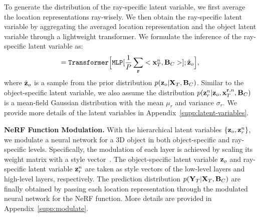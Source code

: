 To generate the distribution of the ray-specific latent variable, we first average the location representations ray-wisely. 
We then obtain the ray-specific latent variable by aggregating the averaged location representation and the object latent variable through a lightweight transformer. We formulate the inference of the ray-specific latent variable as:
\begin{equation}
    [\mu_{{r}}, \sigma_{{r}}] = \texttt{Transformer} \Big[\texttt{MLP}[\frac{1}{P}\sum_{\mathbf{r}}
    <{\bf{x}}_{T}^{n}, {\bf{B}}_C >]; \hat{{\bf{z}}}_o \Big],
\end{equation}
where $\hat{{\bf{z}}}_o$ is a sample from the prior distribution $p({\bf{z}}_o | {\bf{X}}_T, {\bf{B}}_C)$. 
Similar to the object-specific latent variable, we also assume the distribution $p({\bf{z}}_r^n| {\bf{z}}_o,  {\bf{x}}_{T}^{\mathbf{r}, n}, {\bf{B}}_C)$ is a mean-field Gaussian distribution with the mean $\mu_{{r}}$ and variance $\sigma_{{r}}$. We provide more details of the latent variables in Appendix~\ref{supp:latent-variables}.



\noindent  \textbf{NeRF Function Modulation.}
With the hierarchical latent variables $\{{\bf{z}}_o, {\bf{z}}_r^n\}$, we modulate a neural network for a 3D object in both object-specific and ray-specific levels.  Specifically, the modulation of each layer is achieved by scaling its weight matrix with a style vector~\citep{guo2023versatile}. 
The object-specific latent variable ${\bf{z}}_o$ and ray-specific latent variable ${\bf{z}}_r^n$ are taken as style vectors of the low-level layers and high-level layers, respectively. The prediction distribution $p({\bf{Y}}_{T}| {\bf{X}}_{T}, {\bf{B}}_{C})$ are finally obtained by passing each location representation through the modulated neural network for the NeRF function. 
More details are provided in Appendix~\ref{supp:modulate}. 



